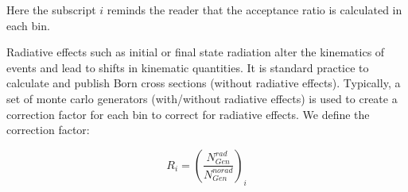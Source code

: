 Here the subscript $i$ reminds the reader that the acceptance ratio is calculated in each bin.  

Radiative effects such as initial or final state radiation alter the kinematics of events and lead to shifts in kinematic quantities.  It is standard practice to calculate and publish Born cross sections (without radiative effects).  Typically, a set of monte carlo generators (with/without radiative effects) is used to create a correction factor for each bin to correct for radiative effects.  We define the correction factor:

\begin{equation}
  R_{i} = \left( \frac{N_{Gen}^{rad}}{N_{Gen}^{norad}} \right)_{i}
\end{equation}
